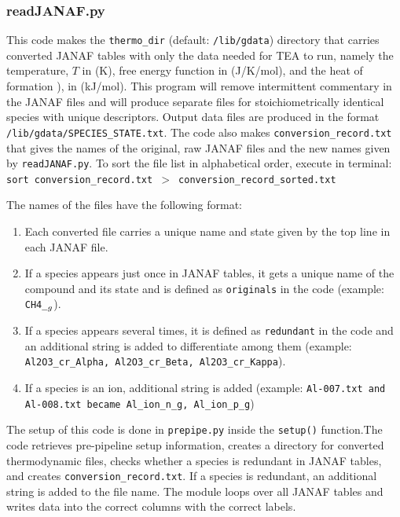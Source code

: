 \subsubsection{readJANAF.py}

This code makes the \texttt{thermo\_dir}
(default: \texttt{/lib/gdata}) directory that carries converted JANAF
tables with only the data needed for TEA to run, namely the
temperature, $T$ in (K), free energy
function  in (J/K/mol), and the
heat of formation ), in (kJ/mol). This
program will remove intermittent commentary in the JANAF files and
will produce separate files for stoichiometrically identical species
with unique descriptors. Output data files are produced in the
format \texttt{/lib/gdata/SPECIES\_STATE.txt}.  The code also
makes \texttt{conversion\_record.txt} that gives the names of the
original, raw JANAF files and the new names given by
\newline \texttt{readJANAF.py}. To sort the file list in
alphabetical order, execute in terminal: \newline \texttt{sort
conversion\_record.txt $>$ conversion\_record\_sorted.txt}

The names of the files have the following format:
{
\begin{enumerate}
\setlength\itemsep{0ex}
\setlength\topsep{0ex}
\setlength\partopsep{0ex}
\setlength\parsep{0ex}

   \item Each converted file carries a unique name and state given by
   the top line in each JANAF file.  \item If a species appears just
   once in JANAF tables, it gets a unique name of the compound and its
   state and is defined as \texttt{originals} in the code
   (example: \texttt{CH4\_$\sb{g}$}).  \item If a species appears
   several times, it is defined as \texttt{redundant} in the code and
   an additional string is added to differentiate among them \newline
   (example: \texttt{Al2O3\_cr\_Alpha, Al2O3\_cr\_Beta,
   Al2O3\_cr\_Kappa}).  \item If a species is an ion, additional
   string is added (example: \texttt{Al-007.txt and Al-008.txt became
   Al\_ion\_n\_g, Al\_ion\_p\_g})
\end{enumerate}
}

The setup of this code is done in \texttt{prepipe.py} inside
the \texttt{setup()} function.The code retrieves pre-pipeline setup
information, creates a directory for converted thermodynamic files,
checks whether a species is redundant in JANAF tables, and
creates \texttt{conversion\_record.txt}. If a species is redundant, an
additional string is added to the file name. The module loops over all
JANAF tables and writes data into the correct columns with the correct
labels.

